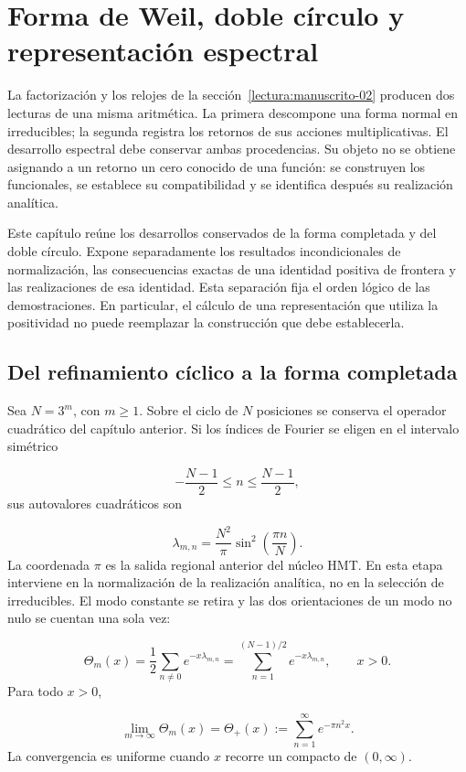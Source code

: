 \section{Forma de Weil, doble círculo y representación espectral}
\label{lectura:manuscrito-03}
La factorización y los relojes de la sección~\ref{lectura:manuscrito-02} producen dos lecturas de una misma aritmética. La primera descompone una forma normal en irreducibles; la segunda registra los retornos de sus acciones multiplicativas. El desarrollo espectral debe conservar ambas procedencias. Su objeto no se obtiene asignando a un retorno un cero conocido de una función: se construyen los funcionales, se establece su compatibilidad y se identifica después su realización analítica.

Este capítulo reúne los desarrollos conservados de la forma completada y del doble círculo. Expone separadamente los resultados incondicionales de normalización, las consecuencias exactas de una identidad positiva de frontera y las realizaciones de esa identidad. Esta separación fija el orden lógico de las demostraciones. En particular, el cálculo de una representación que utiliza la positividad no puede reemplazar la construcción que debe establecerla.

\subsection{Del refinamiento cíclico a la forma completada}
Sea \(N=3^m\), con \(m\geq1\). Sobre el ciclo de \(N\) posiciones se conserva el operador cuadrático del capítulo anterior. Si los índices de Fourier se eligen en el intervalo simétrico

\[
-\frac{N-1}{2}\leq n\leq\frac{N-1}{2},
\]
sus autovalores cuadráticos son

\[
\lambda_{m,n}=\frac{N^2}{\pi}\sin^2\!\left(\frac{\pi n}{N}\right).
\]
La coordenada \(\pi\) es la salida regional anterior del núcleo HMT. En esta etapa interviene en la normalización de la realización analítica, no en la selección de irreducibles. El modo constante se retira y las dos orientaciones de un modo no nulo se cuentan una sola vez:

\[
\Theta_m(x)=\frac12\sum_{n\neq0}e^{-x\lambda_{m,n}}
=\sum_{n=1}^{(N-1)/2}e^{-x\lambda_{m,n}},\qquad x>0.
\]
Para todo \(x>0\),

\[
\lim_{m\to\infty}\Theta_m(x)
=\Theta_+(x):=\sum_{n=1}^{\infty}e^{-\pi n^2x}.
\]
La convergencia es uniforme cuando \(x\) recorre un compacto de \((0,\infty)\).

